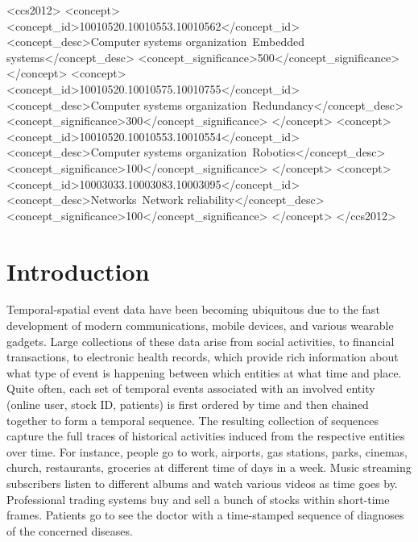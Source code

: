 \documentclass{sig-alternate-05-2015}
\begin{document}
%
%
\begin{CCSXML}
<ccs2012>
 <concept>
  <concept_id>10010520.10010553.10010562</concept_id>
  <concept_desc>Computer systems organization~Embedded systems</concept_desc>
  <concept_significance>500</concept_significance>
 </concept>
 <concept>
  <concept_id>10010520.10010575.10010755</concept_id>
  <concept_desc>Computer systems organization~Redundancy</concept_desc>
  <concept_significance>300</concept_significance>
 </concept>
 <concept>
  <concept_id>10010520.10010553.10010554</concept_id>
  <concept_desc>Computer systems organization~Robotics</concept_desc>
  <concept_significance>100</concept_significance>
 </concept>
 <concept>
  <concept_id>10003033.10003083.10003095</concept_id>
  <concept_desc>Networks~Network reliability</concept_desc>
  <concept_significance>100</concept_significance>
 </concept>
</ccs2012>  
\end{CCSXML}



%
%

%
%
\printccsdesc



\section{Introduction}
Temporal-spatial event data have been becoming ubiquitous due to the fast development of modern communications, mobile devices, and various wearable gadgets. 
%
Large collections of these data arise from social activities, to financial transactions, to electronic health records, which provide rich information about what type of event is happening between which entities at what time and place. 
%
Quite often, each set of temporal events associated with an involved entity (online user, stock ID, patients) is first ordered by time and then chained together to form a temporal sequence. The resulting collection of sequences capture the full traces of historical activities induced from the respective entities over time.
%
For instance, people go to work, airports, gas stations, parks, cinemas, church, restaurants, groceries at different time of days in a week. Music streaming subscribers listen to different albums and watch various videos as time goes by. Professional trading systems buy and sell a bunch of stocks within short-time frames. Patients go to see the doctor with a time-stamped sequence of diagnoses of the concerned diseases. 
\end{document}
